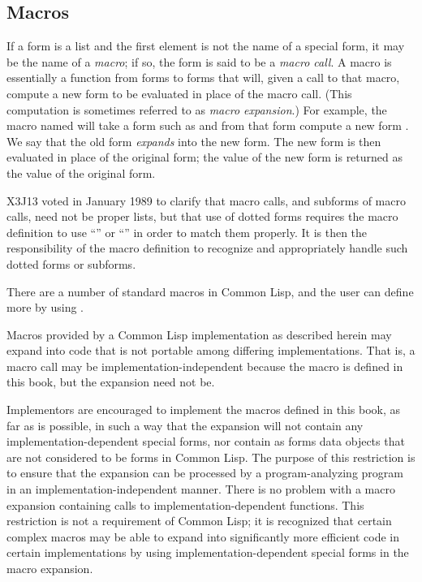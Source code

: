 \subsection{Macros}

If a form is a list and the first element is not the name of a special
form, it may be the name of a \textit{macro}; if so, the form is said
to be a \textit{macro call}.  A macro is essentially a function from
forms to forms that will, given a call to that macro, compute
a new form to be evaluated in place of the macro call.
(This computation is sometimes referred to as \textit{macro expansion}.)
For example, the macro named  will take a form such as
 and from that form compute a new form
.  We say that the old
form \textit{expands} into the new form.  The new form is then evaluated in
place of the original form; the value of the new form is returned as the
value of the original form.

\begin{new}
X3J13 voted in January 1989
to clarify that macro calls, and subforms
of macro calls, need not be proper lists, but that use of dotted forms
requires the macro definition to use ``'' or
``'' in order to match them properly.
It is then the responsibility of the macro definition to recognize
and appropriately handle such dotted forms or subforms.
\end{new}

There are a number of standard macros in Common Lisp, and the user can define more
by using .

Macros provided by a Common Lisp implementation as described herein may expand
into code that is not portable among differing implementations.
That is, a macro call may be implementation-independent because
the macro is defined in this book, but the expansion need not be.

\beforenoterule
\begin{implementation}
Implementors are encouraged to implement the macros
defined in this book, as far as is possible, in such a way that
the expansion will not contain any implementation-dependent
special forms, nor contain as forms data objects that
are not considered to be forms in Common Lisp.
The purpose of this restriction is to ensure that the expansion
can be processed by a program-analyzing program in an
implementation-independent manner.
There is no problem with a macro expansion containing
calls to implementation-dependent functions.
This restriction is not a requirement of Common Lisp; it is recognized
that certain complex macros may be able to expand into significantly
more efficient code in certain implementations
by using implementation-dependent special forms in the macro expansion.
\end{implementation}
\afternoterule

